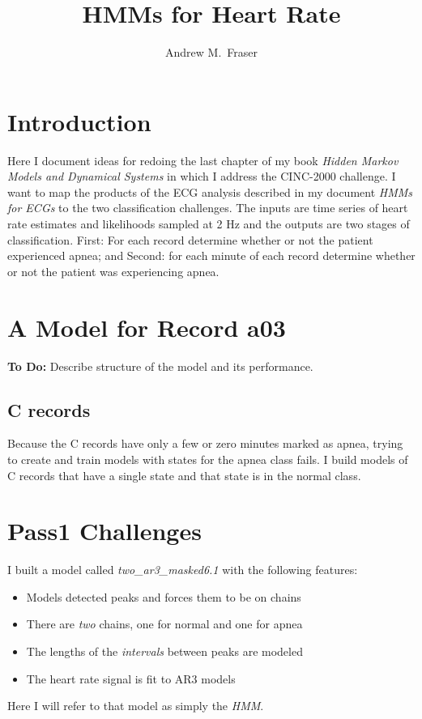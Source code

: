 \documentclass[12pt]{article}
\title{HMMs for Heart Rate}
\author{Andrew M.\ Fraser}
\begin{document}
\maketitle

\section{Introduction}
\label{sec:introduction}

Here I document ideas for redoing the last chapter of my book
\emph{Hidden Markov Models and Dynamical Systems} in which I address
the CINC-2000 challenge.  I want to map the products of the ECG
analysis described in my document \emph{HMMs for ECGs} to the two
classification challenges.  The inputs are time series of heart rate
estimates and likelihoods sampled at 2 Hz and the outputs are two
stages of classification.  First: For each record determine whether or
not the patient experienced apnea; and Second: for each minute of each
record determine whether or not the patient was experiencing apnea.

\section{A Model for Record a03}
\label{sec:a03}

\textbf{To Do:}  Describe structure of the model and its performance.

\subsection{C records}
\label{sec:c_records}

Because the C records have only a few or zero minutes marked as apnea,
trying to create and train models with states for the apnea class
fails.  I build models of C records that have a single state and that
state is in the normal class.

\section{Pass1 Challenges}
\label{sec:pass1}

I built a model called \emph{two\_ar3\_masked6.1} with the following
features:
\begin{itemize}
\item Models detected peaks and forces them to be on chains
\item There are \emph{two} chains, one for normal and one for apnea
\item The lengths of the \emph{intervals} between peaks are modeled
\item The heart rate signal is fit to AR3 models
\end{itemize}
Here I will refer to that model as simply the \emph{HMM}.
\end{document}
